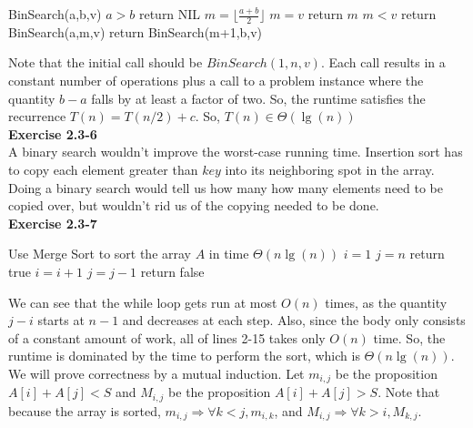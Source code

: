 \documentclass{article}
\begin{document}
\begin{algorithm}\begin{algorithmic}[1]
\State BinSearch(a,b,v)
\If $a>b$
\State return NIL
\EndIf
\State $m = \lfloor \frac{a+b}{2}\rfloor$
\If $m=v$
\State return $m$
\EndIf
\If $m<v$
\State return BinSearch(a,m,v)
\EndIf
\State return BinSearch(m+1,b,v)
\end{algorithmic}
\end{algorithm}
Note that the initial call should be $BinSearch(1,n,v)$. Each call results in a constant number of operations plus a call to a problem instance where the quantity $b-a$ falls by at least a factor of two. So, the runtime satisfies the recurrence $T(n)= T(n/2)+c$. So, $T(n)\in\Theta(\lg(n))$ \\

\noindent\textbf{Exercise 2.3-6}\\

A binary search wouldn't improve the worst-case running time.  Insertion sort has to copy each element greater than $key$ into its neighboring spot in the array.  Doing a binary search would tell us how many how many elements need to be copied over, but wouldn't rid us of the copying needed to be done. \\

\noindent\textbf{Exercise 2.3-7}\\

\begin{algorithm} \begin{algorithmic}[1]
 \State Use Merge Sort to sort the array $A$ in time $\Theta(n\lg(n))$
\State $i=1$
\State $j = n$
 \State return true
 \EndIf
 \State $ i = i+1$
 \EndIf 
 \State $ j = j-1$
 \EndIf 
 \EndWhile
 \State return false
 \end{algorithmic}
\end{algorithm}

We can see that the while loop gets run at most $O(n)$ times, as the quantity $j-i$ starts at $n-1$ and decreases at each step. Also, since the body only consists of a constant amount of work, all of lines 2-15 takes only $O(n)$ time. So, the runtime is dominated by the time to perform the sort, which is $\Theta(n\lg(n))$. We will prove correctness by a mutual induction. Let $m_{i,j}$ be the proposition $A[i]+A[j]<S$ and $M_{i,j}$ be the proposition $A[i]+A[j]>S$. Note that because the array is sorted, $m_{i,j} \Rightarrow \forall k<j, m_{i,k}$, and $M_{i,j} \Rightarrow \forall k>i, M_{k,j}$. 
\end{document}
